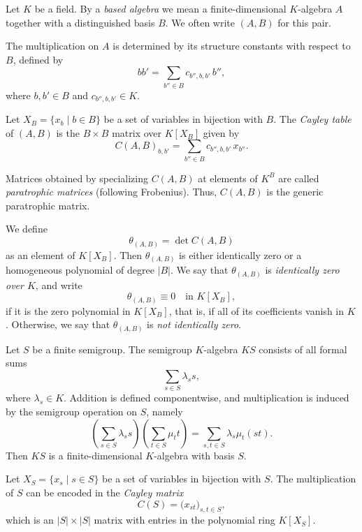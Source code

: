\documentclass[11pt,reqno]{amsart}
\theoremstyle{plain}
\theoremstyle{remark}
\theoremstyle{definition}
\begin{document}
Let $K$ be a field. By a \emph{based algebra} we mean a finite-dimensional $K$-algebra $A$ together 
with a distinguished basis $B$. We often write $(A,B)$ for this pair. 

The multiplication on $A$ is determined by its structure constants with respect to $B$, defined by
\[
bb' = \sum_{b'' \in B} c_{b'',b,b'}\, b'',
\]
where $b,b' \in B$ and $c_{b'',b,b'} \in K$.

Let $X_B = \{x_b \mid b \in B\}$ be a set of variables in bijection with $B$. 
The \emph{Cayley table} of $(A,B)$ is the $B \times B$ matrix over $K[X_B]$ given by
\[
C(A,B)_{b,b'} = \sum_{b'' \in B} c_{b'',b,b'}\, x_{b''}.
\]

Matrices obtained by specializing $C(A,B)$ at elements of $K^B$ are called 
\emph{paratrophic matrices} (following Frobenius). Thus, $C(A,B)$ is the generic 
paratrophic matrix.

We define
\[
\theta_{(A,B)} = \det C(A,B)
\]
as an element of $K[X_B]$. Then $\theta_{(A,B)}$ is either identically zero 
or a homogeneous polynomial of degree $|B|$.
We say that $\theta_{(A,B)}$ is \emph{identically zero over $K$}, and write
\[
\theta_{(A,B)} \equiv 0 \quad \text{in } K[X_B],
\]
if it is the zero polynomial in $K[X_B]$, that is, if all of its coefficients vanish in $K$. 
Otherwise, we say that $\theta_{(A,B)}$ is \emph{not identically zero}.

Let $S$ be a finite semigroup. The semigroup $K$-algebra $KS$ consists of all formal sums
\[
\sum_{s \in S} \lambda_s s,
\]
where $\lambda_s \in K$. Addition is defined componentwise, and multiplication is induced by the
semigroup operation on $S$, namely
\[
\left( \sum_{s \in S} \lambda_s s \right)
\left( \sum_{t \in S} \mu_t t \right)
=
\sum_{s,t \in S} \lambda_s \mu_t (st).
\]
Then $KS$ is a finite-dimensional $K$-algebra with basis $S$.

Let $X_S = \{ x_s \mid s \in S \}$ be a set of variables in bijection with $S$.
The multiplication of $S$ can be encoded in the \emph{Cayley matrix}
\[
C(S) = \big( x_{st} \big)_{s,t \in S},
\]
which is an $|S| \times |S|$ matrix with entries in the polynomial ring $K[X_S]$.
\end{document}
